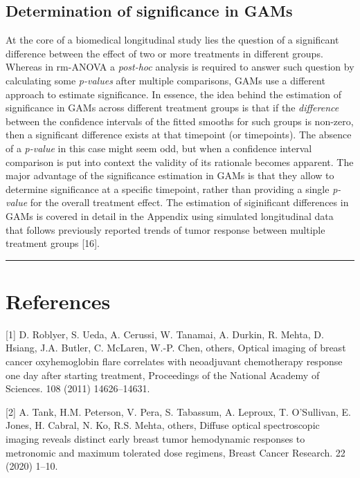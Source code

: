 \documentclass[
]{article}
\begin{document}
\hypertarget{determination-of-significance-in-gams}{%
\subsection{Determination of significance in GAMs}\label{determination-of-significance-in-gams}}

At the core of a biomedical longitudinal study lies the question of a significant difference between the effect of two or more treatments in different groups. Whereas in rm-ANOVA a \emph{post-hoc} analysis is required to answer such question by calculating some \emph{p-values} after multiple comparisons, GAMs use a different approach to estimate significance. In essence, the idea behind the estimation of significance in GAMs across different treatment groups is that if the \emph{difference} between the confidence intervals of the fitted smooths for such groups is non-zero, then a significant difference exists at that timepoint (or timepoints). The absence of a \emph{p-value} in this case might seem odd, but when a confidence interval comparison is put into context the validity of its rationale becomes apparent. The major advantage of the significance estimation in GAMs is that they allow to determine significance at a specific timepoint, rather than providing a single \emph{p-value} for the overall treatment effect. The estimation of siginificant differences in GAMs is covered in detail in the Appendix using simulated longitudinal data that follows previously reported trends of tumor response between multiple treatment groups {[}16{]}.

\begin{center}\rule{0.5\linewidth}{0.5pt}\end{center}

\hypertarget{references}{%
\section*{References}\label{references}}

\hypertarget{refs}{}
\leavevmode\hypertarget{ref-roblyer2011}{}%
{[}1{]} D. Roblyer, S. Ueda, A. Cerussi, W. Tanamai, A. Durkin, R. Mehta, D. Hsiang, J.A. Butler, C. McLaren, W.-P. Chen, others, Optical imaging of breast cancer oxyhemoglobin flare correlates with neoadjuvant chemotherapy response one day after starting treatment, Proceedings of the National Academy of Sciences. 108 (2011) 14626--14631.

\leavevmode\hypertarget{ref-tank2020}{}%
{[}2{]} A. Tank, H.M. Peterson, V. Pera, S. Tabassum, A. Leproux, T. O'Sullivan, E. Jones, H. Cabral, N. Ko, R.S. Mehta, others, Diffuse optical spectroscopic imaging reveals distinct early breast tumor hemodynamic responses to metronomic and maximum tolerated dose regimens, Breast Cancer Research. 22 (2020) 1--10.
\end{document}
